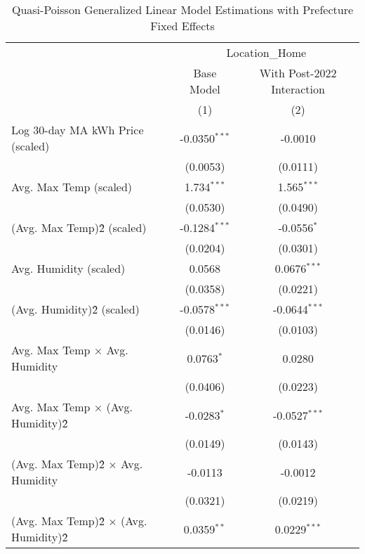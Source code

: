 
\begin{table}[htbp]
   \caption{Quasi-Poisson Generalized Linear Model Estimations with Prefecture Fixed Effects}
   \bigskip
   \centering
   \begin{tabular}{lcc}
      \toprule
       & \multicolumn{2}{c}{Location\_Home}\\
                                                & Base Model      & With Post-2022 Interaction \\   
                                                & (1)             & (2)\\  
      \midrule 
      Log 30-day MA kWh Price (scaled)          & -0.0350$^{***}$ & -0.0010\\   
                                                & (0.0053)        & (0.0111)\\   
      Avg. Max Temp (scaled)                    & 1.734$^{***}$   & 1.565$^{***}$\\   
                                                & (0.0530)        & (0.0490)\\   
      (Avg. Max Temp)\^2 (scaled)               & -0.1284$^{***}$ & -0.0556$^{*}$\\   
                                                & (0.0204)        & (0.0301)\\   
      Avg. Humidity (scaled)                    & 0.0568          & 0.0676$^{***}$\\   
                                                & (0.0358)        & (0.0221)\\   
      (Avg. Humidity)\^2 (scaled)               & -0.0578$^{***}$ & -0.0644$^{***}$\\   
                                                & (0.0146)        & (0.0103)\\   
      Avg. Max Temp × Avg. Humidity             & 0.0763$^{*}$    & 0.0280\\   
                                                & (0.0406)        & (0.0223)\\   
      Avg. Max Temp × (Avg. Humidity)\^2        & -0.0283$^{*}$   & -0.0527$^{***}$\\   
                                                & (0.0149)        & (0.0143)\\   
      (Avg. Max Temp)\^2 × Avg. Humidity        & -0.0113         & -0.0012\\   
                                                & (0.0321)        & (0.0219)\\   
      (Avg. Max Temp)\^2 × (Avg. Humidity)\^2   & 0.0359$^{**}$   & 0.0229$^{***}$\\   

\end{tabular}
\end{table}
